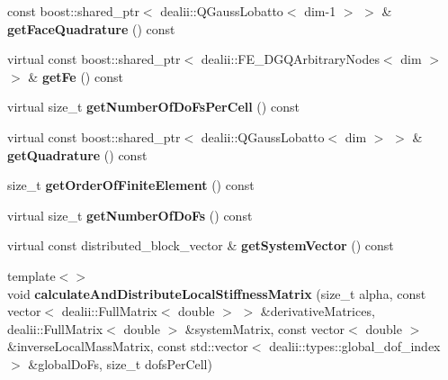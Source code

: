 \begin{DoxyCompactItemize}
\item 
\hypertarget{classnatrium_1_1SEDGMinLee_a42897893820c9d12e9fea6f5518e3447}{
const boost::shared\_\-ptr$<$ dealii::QGaussLobatto$<$ dim-\/1 $>$ $>$ \& {\bfseries getFaceQuadrature} () const }
\label{classnatrium_1_1SEDGMinLee_a42897893820c9d12e9fea6f5518e3447}

\item 
\hypertarget{classnatrium_1_1SEDGMinLee_ab7cd0a95e74da6d4d16ab2d174b17458}{
virtual const boost::shared\_\-ptr$<$ dealii::FE\_\-DGQArbitraryNodes$<$ dim $>$ $>$ \& {\bfseries getFe} () const }
\label{classnatrium_1_1SEDGMinLee_ab7cd0a95e74da6d4d16ab2d174b17458}

\item 
\hypertarget{classnatrium_1_1SEDGMinLee_a5dac839ef4963af315dba5f201bd763c}{
virtual size\_\-t {\bfseries getNumberOfDoFsPerCell} () const }
\label{classnatrium_1_1SEDGMinLee_a5dac839ef4963af315dba5f201bd763c}

\item 
\hypertarget{classnatrium_1_1SEDGMinLee_ad36da36624c983cf84716d97442b1989}{
virtual const boost::shared\_\-ptr$<$ dealii::QGaussLobatto$<$ dim $>$ $>$ \& {\bfseries getQuadrature} () const }
\label{classnatrium_1_1SEDGMinLee_ad36da36624c983cf84716d97442b1989}

\item 
\hypertarget{classnatrium_1_1SEDGMinLee_a745a65de3ee72a250c0706e6c7fcc361}{
size\_\-t {\bfseries getOrderOfFiniteElement} () const }
\label{classnatrium_1_1SEDGMinLee_a745a65de3ee72a250c0706e6c7fcc361}

\item 
\hypertarget{classnatrium_1_1SEDGMinLee_af667cda1a894340f614da67c0a0ae5da}{
virtual size\_\-t {\bfseries getNumberOfDoFs} () const }
\label{classnatrium_1_1SEDGMinLee_af667cda1a894340f614da67c0a0ae5da}

\item 
\hypertarget{classnatrium_1_1SEDGMinLee_ac4d17489cf8bf5e98bd7bd4e3e32f0d4}{
virtual const distributed\_\-block\_\-vector \& {\bfseries getSystemVector} () const }
\label{classnatrium_1_1SEDGMinLee_ac4d17489cf8bf5e98bd7bd4e3e32f0d4}

\item 
\hypertarget{classnatrium_1_1SEDGMinLee_ab9bdc47144e9e45960ca1bee2593d713}{
{\footnotesize template$<$$>$ }\\void {\bfseries calculateAndDistributeLocalStiffnessMatrix} (size\_\-t alpha, const vector$<$ dealii::FullMatrix$<$ double $>$ $>$ \&derivativeMatrices, dealii::FullMatrix$<$ double $>$ \&systemMatrix, const vector$<$ double $>$ \&inverseLocalMassMatrix, const std::vector$<$ dealii::types::global\_\-dof\_\-index $>$ \&globalDoFs, size\_\-t dofsPerCell)}
\label{classnatrium_1_1SEDGMinLee_ab9bdc47144e9e45960ca1bee2593d713}


\end{DoxyCompactItemize}
